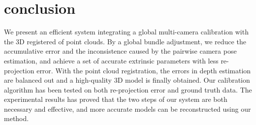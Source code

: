 \comments{}

\section{conclusion}
We present an efficient system integrating a global multi-camera calibration with the 3D registered of point clouds. 
By a global bundle adjustment, we reduce the accumulative error and the inconsistence caused by the pairwise camera pose estimation, and achieve a set of accurate extrinsic parameters with less re-projection error. 
With the point cloud registration, the errors in depth estimation are balanced out and a high-quality 3D model is finally obtained. 
Our calibration algorithm has been tested on both re-projection error and ground truth data. The experimental results has proved that the two steps of our system are both necessary and effective, and more accurate models can be reconstructed using our method.



